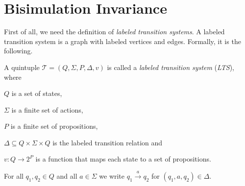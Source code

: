 
\section{Bisimulation Invariance}\label{sec:bisimulationInvariance}

First of all, we need the definition of \textit{labeled transition systems}. A labeled transition system is a graph
with labeled vertices and edges. Formally, it is the following.

\begin{definition}
    \label{definition:lts}
    A quintuple $\mathcal{T} = (Q, \Sigma, P, \Delta, v)$ is called a \emph{labeled transition system} (\emph{LTS}),
    where
    \begin{compactitem}
        \item $Q$ is a set of states,
        \item $\Sigma$ is a finite set of actions,
        \item $P$ is a finite set of propositions,
        \item $\Delta \subseteq Q \times \Sigma \times Q$ is the labeled transition relation and
        \item $v: Q \rightarrow 2^P$ is a function that maps each state to a set of propositions.
    \end{compactitem}
\end{definition}

For all $q_1, q_2 \in Q$ and all $a \in \Sigma$ we write $q_1 \overset{a}{\rightarrow} q_2$ for $(q_1, a, q_2) \in
\Delta$.

